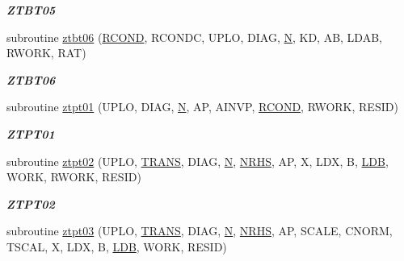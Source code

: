 \begin{DoxyCompactItemize}
\begin{DoxyCompactList}\small\item\em {\bfseries Z\+T\+B\+T05} \end{DoxyCompactList}\item 
subroutine \hyperlink{group__complex16__lin_ga36a5116fd7b1d89e4f15688c65c5551d}{ztbt06} (\hyperlink{superlu__enum__consts_8h_af00a42ecad444bbda75cde1b64bd7e72a9b5c151728d8512307565994c89919d5}{R\+C\+O\+N\+D}, R\+C\+O\+N\+D\+C, U\+P\+L\+O, D\+I\+A\+G, \hyperlink{polmisc_8c_a0240ac851181b84ac374872dc5434ee4}{N}, K\+D, A\+B, L\+D\+A\+B, R\+W\+O\+R\+K, R\+A\+T)
\begin{DoxyCompactList}\small\item\em {\bfseries Z\+T\+B\+T06} \end{DoxyCompactList}\item 
subroutine \hyperlink{group__complex16__lin_ga9e8fba67396dc4fcbf7fb7684ea8d3c1}{ztpt01} (U\+P\+L\+O, D\+I\+A\+G, \hyperlink{polmisc_8c_a0240ac851181b84ac374872dc5434ee4}{N}, A\+P, A\+I\+N\+V\+P, \hyperlink{superlu__enum__consts_8h_af00a42ecad444bbda75cde1b64bd7e72a9b5c151728d8512307565994c89919d5}{R\+C\+O\+N\+D}, R\+W\+O\+R\+K, R\+E\+S\+I\+D)
\begin{DoxyCompactList}\small\item\em {\bfseries Z\+T\+P\+T01} \end{DoxyCompactList}\item 
subroutine \hyperlink{group__complex16__lin_gaa7b122ee2067d6c327990121fe7e5919}{ztpt02} (U\+P\+L\+O, \hyperlink{superlu__enum__consts_8h_a0c4e17b2d5cea33f9991ccc6a6678d62a1f61e3015bfe0f0c2c3fda4c5a0cdf58}{T\+R\+A\+N\+S}, D\+I\+A\+G, \hyperlink{polmisc_8c_a0240ac851181b84ac374872dc5434ee4}{N}, \hyperlink{example__user_8c_aa0138da002ce2a90360df2f521eb3198}{N\+R\+H\+S}, A\+P, X, L\+D\+X, B, \hyperlink{example__user_8c_a50e90a7104df172b5a89a06c47fcca04}{L\+D\+B}, W\+O\+R\+K, R\+W\+O\+R\+K, R\+E\+S\+I\+D)
\begin{DoxyCompactList}\small\item\em {\bfseries Z\+T\+P\+T02} \end{DoxyCompactList}\item 
subroutine \hyperlink{group__complex16__lin_gabe1218bb8cac2ad44552d4c70b5c096a}{ztpt03} (U\+P\+L\+O, \hyperlink{superlu__enum__consts_8h_a0c4e17b2d5cea33f9991ccc6a6678d62a1f61e3015bfe0f0c2c3fda4c5a0cdf58}{T\+R\+A\+N\+S}, D\+I\+A\+G, \hyperlink{polmisc_8c_a0240ac851181b84ac374872dc5434ee4}{N}, \hyperlink{example__user_8c_aa0138da002ce2a90360df2f521eb3198}{N\+R\+H\+S}, A\+P, S\+C\+A\+L\+E, C\+N\+O\+R\+M, T\+S\+C\+A\+L, X, L\+D\+X, B, \hyperlink{example__user_8c_a50e90a7104df172b5a89a06c47fcca04}{L\+D\+B}, W\+O\+R\+K, R\+E\+S\+I\+D)

\end{DoxyCompactItemize}

